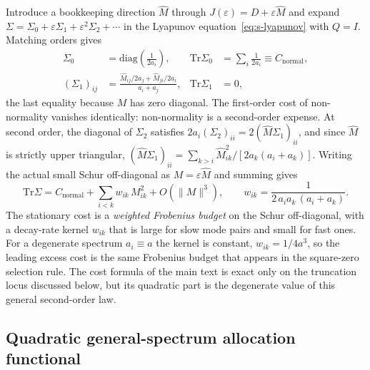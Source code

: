 \documentclass[
  aps,prl,preprint,notitlepage,superscriptaddress,nofootinbib,longbibliography,
  amsmath,amssymb
]{revtex4-2}
\newcommand{\Tr}{\mathrm{Tr}}
\begin{document}
Introduce a bookkeeping direction $\widehat M$ through
$J(\varepsilon)=D+\varepsilon\widehat M$ and expand
$\Sigma=\Sigma_0+\varepsilon\Sigma_1+\varepsilon^2\Sigma_2+\cdots$ in the Lyapunov
equation~\eqref{eq:s-lyapunov} with $Q=I$. Matching orders gives
\begin{align}
\Sigma_0&=\mathrm{diag}\!\left(\tfrac{1}{2a_i}\right),
&\Tr\Sigma_0&=\sum_i\frac{1}{2a_i}\equiv C_{\mathrm{normal}},
\label{eq:s-gen0}\\
(\Sigma_1)_{ij}&=\frac{\widehat M_{ij}/2a_j+\widehat M_{ji}/2a_i}{a_i+a_j},
&\Tr\Sigma_1&=0,
\label{eq:s-gen1}
\end{align}
the last equality because $M$ has zero diagonal. The first-order cost of
non-normality vanishes identically: non-normality is a second-order expense. At
second order, the diagonal of $\Sigma_2$ satisfies
$2a_i(\Sigma_2)_{ii}=2(\widehat M\Sigma_1)_{ii}$, and since $\widehat M$ is
strictly upper triangular,
$(\widehat M\Sigma_1)_{ii}=\sum_{k>i}\widehat M_{ik}^2/[2a_k(a_i+a_k)]$.
Writing the actual small Schur off-diagonal as $M=\varepsilon\widehat M$ and
summing gives
\begin{equation}
\Tr\Sigma
=C_{\mathrm{normal}}
+\sum_{i<k} w_{ik}\,M_{ik}^2
+O(\|M\|^3),
\qquad
w_{ik}=\frac{1}{2\,a_i a_k\,(a_i+a_k)}.
\label{eq:s-gencost}
\end{equation}
The stationary cost is a \emph{weighted Frobenius budget} on the Schur
off-diagonal, with a decay-rate kernel $w_{ik}$ that is large for slow
mode pairs and small for fast ones. For a degenerate spectrum $a_i\equiv a$ the
kernel is constant, $w_{ik}=1/4a^3$, so the leading excess cost is the same
Frobenius budget that appears in the square-zero selection rule. The cost formula
of the main text is exact only on the truncation locus discussed below, but its
quadratic part is the degenerate value of this general second-order law.

\subsection{Quadratic general-spectrum allocation functional}
\label{sec:s-genopt}
\end{document}
